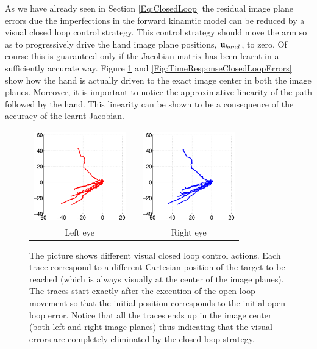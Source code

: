As we have already seen in Section \ref{Eq:ClosedLoop} the residual image plane errors 
due the imperfections in the forward kinamtic model can be reduced by a visual closed loop
control strategy. This control strategy should move the arm so as to progressively drive the
hand image plane positions, $\mathbf{u}_{hand}$, to zero. Of course this is guaranteed 
only if the  Jacobian matrix has been learnt in a sufficiently accurate way. Figure 
\ref{Fig:ImagePlaneClosedLoopErrors} and \ref{Fig:TimeResponseClosedLoopErrors} 
show how the hand is actually driven to the 
exact image center in both the image planes. Moreover, it is important to notice the
approximative linearity of the path followed by the hand. This linearity can be shown
to be a consequence of the accuracy of the learnt Jacobian.

\begin{figure}
  \begin{center}
	\begin{tabular}{ccc}
	  \parbox{40mm}{\includegraphics[width=40mm]{Figure/LeftEyeClosedLoop.eps}}  & \hspace{2cm} &
	  \parbox{40mm}{\includegraphics[width=40mm]{Figure/RightEyeClosedLoop.eps}}
	  \\
	  \parbox{40mm}{\centering Left eye } & \hspace{2cm} & \parbox{40mm}{\centering Right eye }
  \end{tabular}
\end{center}
\caption{The picture shows different visual closed loop control actions. Each trace correspond to a different Cartesian position of the target to be reached (which is always visually at the center of the image planes). The traces start exactly after the execution of the open loop movement so that the initial position corresponds to the initial open loop error. Notice that all the traces ends up in the image center (both left and right image planes) thus indicating that the visual errors are completely eliminated by the closed loop strategy.}\label{Fig:ImagePlaneClosedLoopErrors}
  \end{figure}

